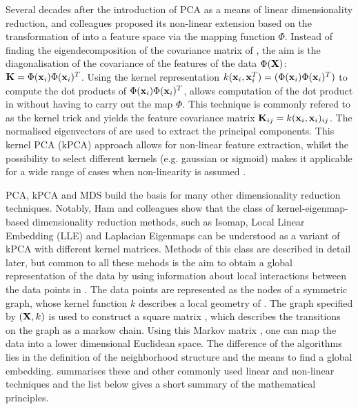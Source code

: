 Several decades after the introduction of PCA as a means of linear dimensionality reduction, \citet{Schoelkopf1998} and colleagues proposed its non-linear extension based on the transformation of  into a feature space  via the mapping function  \(\Phi\). Instead of finding the eigendecomposition of the covariance matrix of , the aim is the diagonalisation of the covariance  of the features of the data \(\Phi(\boldsymbol{\mathbf{X}})\): \(\boldsymbol{\mathbf{K}} = \Phi(\boldsymbol{\mathbf{x}}_{i})\Phi(\boldsymbol{\mathbf{x}}_{i})^T\). Using the kernel representation \(k(\boldsymbol{\mathbf{x}}_{i}, \boldsymbol{\mathbf{x}}_{i}^T) = (\Phi(\boldsymbol{\mathbf{x}}_{i})\Phi(\boldsymbol{\mathbf{x}}_{i})^T)\) to compute the dot products of \(\Phi(\boldsymbol{\mathbf{x}}_{i})\Phi(\boldsymbol{\mathbf{x}}_{i})^T\), allows computation of the dot product in  without having to carry out the map \(\Phi\). This technique is commonly refered to as the kernel trick and yields the feature covariance matrix \(\boldsymbol{\mathbf{K}}_{ij} = k(\boldsymbol{\mathbf{x}}_{i}, \boldsymbol{\mathbf{x}}_{i})_{ij}\). The normalised eigenvectors of  are used to extract the principal components. This kernel PCA (kPCA) approach allows for non-linear feature extraction, whilst the possibility to select different kernels (e.g. gaussian or sigmoid) makes it applicable for a wide range of cases when non-linearity is assumed \citep{Schoelkopf1998}.

PCA, kPCA and MDS build the basis for many other dimensionality reduction techniques. Notably, Ham and colleagues show that the class of kernel-eigenmap-based dimensionality reduction methods, such as Isomap, Local Linear Embedding (LLE) and Laplacian Eigenmaps can be understood as a variant of kPCA with different kernel matrices. Methods of this class are described in detail later, but common to all these mehods is the aim to obtain a global representation of the data  by using information about local interactions between the data points in . The data points are represented as the nodes of a symmetric graph, whose kernel function \(k\) describes a local geometry of . The graph specified by \((\boldsymbol{\mathbf{X}}, k)\) is used to construct a square matrix , which describes the transitions on the graph as a markow chain. Using this Markov matrix , one can map the data into a lower dimensional Euclidean space. The difference of the algorithms lies in the definition of the neighborhood structure and the means to find a global embedding.  summarises these and other commonly used linear and non-linear techniques and the list below gives a short summary of the mathematical principles. 

